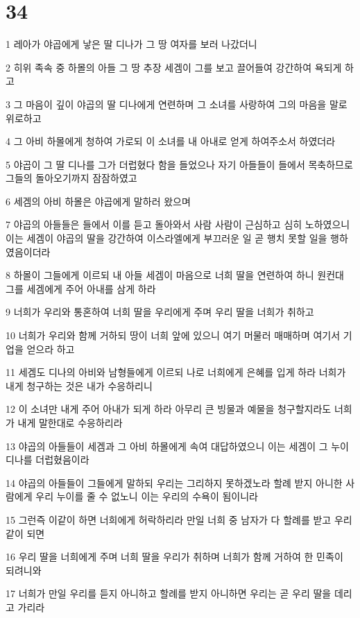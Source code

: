 \chapter{34}

\par 1 레아가 야곱에게 낳은 딸 디나가 그 땅 여자를 보러 나갔더니
\par 2 히위 족속 중 하몰의 아들 그 땅 추장 세겜이 그를 보고 끌어들여 강간하여 욕되게 하고
\par 3 그 마음이 깊이 야곱의 딸 디나에게 연련하며 그 소녀를 사랑하여 그의 마음을 말로 위로하고
\par 4 그 아비 하몰에게 청하여 가로되 이 소녀를 내 아내로 얻게 하여주소서 하였더라
\par 5 야곱이 그 딸 디나를 그가 더럽혔다 함을 들었으나 자기 아들들이 들에서 목축하므로 그들의 돌아오기까지 잠잠하였고
\par 6 세겜의 아비 하몰은 야곱에게 말하러 왔으며
\par 7 야곱의 아들들은 들에서 이를 듣고 돌아와서 사람 사람이 근심하고 심히 노하였으니 이는 세겜이 야곱의 딸을 강간하여 이스라엘에게 부끄러운 일 곧 행치 못할 일을 행하였음이더라
\par 8 하몰이 그들에게 이르되 내 아들 세겜이 마음으로 너희 딸을 연련하여 하니 원컨대 그를 세겜에게 주어 아내를 삼게 하라
\par 9 너희가 우리와 통혼하여 너희 딸을 우리에게 주며 우리 딸을 너희가 취하고
\par 10 너희가 우리와 함께 거하되 땅이 너희 앞에 있으니 여기 머물러 매매하며 여기서 기업을 얻으라 하고
\par 11 세겜도 디나의 아비와 남형들에게 이르되 나로 너희에게 은혜를 입게 하라 너희가 내게 청구하는 것은 내가 수응하리니
\par 12 이 소녀만 내게 주어 아내가 되게 하라 아무리 큰 빙물과 예물을 청구할지라도 너희가 내게 말한대로 수응하리라
\par 13 야곱의 아들들이 세겜과 그 아비 하몰에게 속여 대답하였으니 이는 세겜이 그 누이 디나를 더럽혔음이라
\par 14 야곱의 아들들이 그들에게 말하되 우리는 그리하지 못하겠노라 할례 받지 아니한 사람에게 우리 누이를 줄 수 없노니 이는 우리의 수욕이 됨이니라
\par 15 그런즉 이같이 하면 너희에게 허락하리라 만일 너희 중 남자가 다 할례를 받고 우리 같이 되면
\par 16 우리 딸을 너희에게 주며 너희 딸을 우리가 취하며 너희가 함께 거하여 한 민족이 되려니와
\par 17 너희가 만일 우리를 듣지 아니하고 할례를 받지 아니하면 우리는 곧 우리 딸을 데리고 가리라
